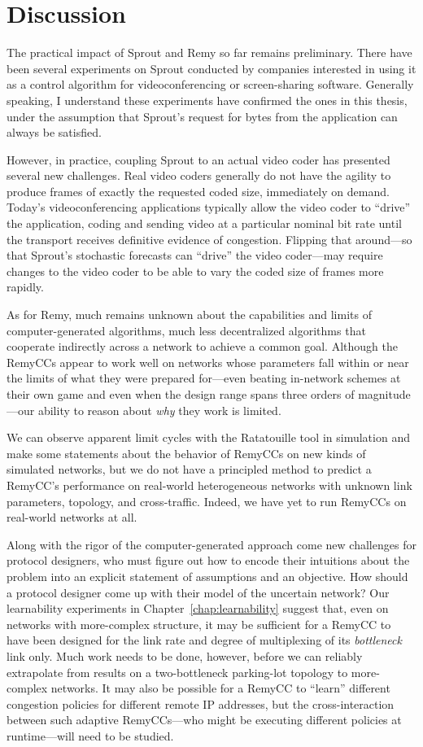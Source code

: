 \chapter{Discussion}

The practical impact of Sprout and Remy so far remains
preliminary. There have been several experiments on Sprout conducted
by companies interested in using it as a control algorithm for
videoconferencing or screen-sharing software. Generally speaking, I understand these
experiments have confirmed the ones in this thesis, under
the assumption that Sprout's request for bytes from the application
can always be satisfied.

However, in practice, coupling Sprout to an actual video coder has
presented several new challenges. Real video coders generally do not
have the agility to produce frames of exactly the requested coded
size, immediately on demand. Today's videoconferencing applications
typically allow the video coder to ``drive'' the application, coding and
sending video at a particular nominal bit rate until the transport
receives definitive evidence of congestion. Flipping that around---so
that Sprout's stochastic forecasts can ``drive'' the video
coder---may require changes to the video coder to be able to vary
the coded size of frames more rapidly.

As for Remy, much remains unknown about the capabilities and limits of
computer-generated algorithms, much less decentralized algorithms that
cooperate indirectly across a network to achieve a common
goal. Although the RemyCCs appear to work well on networks whose
parameters fall within or near the limits of what they were prepared
for---even beating in-network schemes at their own game and even
when the design range spans three orders of magnitude---our ability to reason about \emph{why} they
work is limited.

We can observe apparent limit cycles with the Ratatouille tool in
simulation and make some statements about the behavior of RemyCCs on
new kinds of simulated networks, but we do not have a principled
method to predict a RemyCC's performance on real-world heterogeneous
networks with unknown link parameters, topology, and cross-traffic.
Indeed, we have yet to run RemyCCs on real-world networks at all.

Along with the rigor of the computer-generated approach come new
challenges for protocol designers, who must figure out how to encode
their intuitions about the problem into an explicit statement of
assumptions and an objective. How should a protocol designer come up
with their model of the uncertain network? Our learnability
experiments in Chapter~\ref{chap:learnability} suggest that, even on
networks with more-complex structure, it may be sufficient for a
RemyCC to have been designed for the link rate and degree of
multiplexing of its \emph{bottleneck} link only. Much work needs to be
done, however, before we can reliably extrapolate from results on a
two-bottleneck parking-lot topology to more-complex networks. It may
also be possible for a RemyCC to ``learn'' different congestion
policies for different remote IP addresses, but the cross-interaction
between such adaptive RemyCCs---who might be executing different
policies at runtime---will need to be studied.

